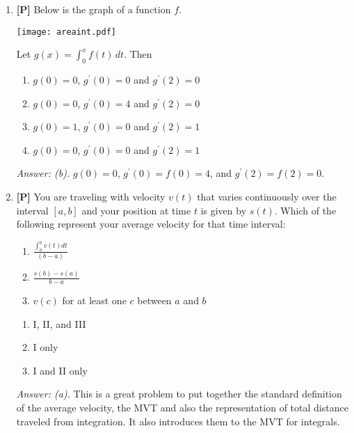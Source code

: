 \documentclass[12pt]{article}
\begin{document}
\begin{enumerate}
{\it Answer: (b).} This problem can help students realize that
an integral of this form is a specific function (not a general
antiderivative), and the integrand is its derivative. Students can induce information about the concavity of $g$ just like they
normally would with any other function, only that this time they
have to look at $f$. 

\bigskip

\item {\bf [P]} Below is the graph of a function $f$.

\begin{center}
\texttt{[image: areaint.pdf]}
\end{center}

Let $\displaystyle{g(x)=\int_0^x f(t) \, dt.}$ Then 
\begin {enumerate}
\item $g(0)=0$, $g^{\prime}(0)=0$ and $g^{\prime}(2)=0$
\item $g(0)=0$, $g^{\prime}(0)=4$ and $g^{\prime}(2)=0$
\item $g(0)=1$, $g^{\prime}(0)=0$ and $g^{\prime}(2)=1$
\item $g(0)=0$, $g^{\prime}(0)=0$ and $g^{\prime}(2)=1$
\end{enumerate}

{\it Answer: (b).} $g(0)=0$, $g^{\prime}(0)=f(0)=4$, and $g^{\prime}(2)=f(2)=0$.

\bigskip

\item {\bf [P]} You are traveling with velocity $v(t)$  that varies continuously
over the interval $[a,b]$  and  your position at time $t$ is given
by $s(t)$. Which of the following represent your average velocity for
that time interval:
\renewcommand{\theenumii}{\Roman{enumii}}
\begin{enumerate}
\item $\displaystyle{\frac{\int_a^b v(t)dt}{(b-a)}}$
\item $\displaystyle{\frac{s(b)-s(a)}{b-a}}$
\item $v(c)$ for at least one $c$ between $a$ and $b$
\end{enumerate}

\renewcommand{\theenumii}{\alph{enumii}}
\begin{enumerate}
\item I, II, and III
\item I only
\item I and II only
\end{enumerate}

{\it Answer: (a).} This is a great problem to put together the
standard definition of the average velocity, the MVT and also the
representation of total distance traveled from integration. It
also introduces them to the MVT for integrals. 

\end{enumerate}
\end{document}
